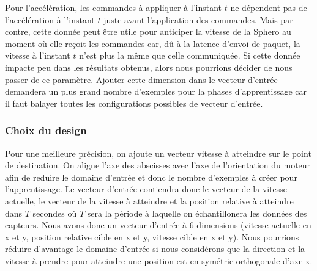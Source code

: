 Pour l'accélération, les commandes à appliquer à l'instant $t$ ne dépendent pas de l'accélération à l'instant $t$ juste avant l'application des commandes.
Mais par contre, cette donnée peut être utile pour anticiper la vitesse de la Sphero au moment où elle reçoit les commandes car, dû à la latence d'envoi de paquet, la vitesse à l'instant $t$ n'est plus la même que celle communiquée.
Si cette donnée impacte peu dans les résultats obtenus, alors nous pourrions décider de nous passer de ce paramètre.
Ajouter cette dimension dans le vecteur d'entrée demandera un plus grand nombre d'exemples pour la phases d'apprentissage car il faut balayer toutes les configurations possibles de vecteur d'entrée.

\newcommand{\inchist}[1]{
 \begin{minipage}{0.48\textwidth}
  \texttt{[image: ../figures/hist\#1.jpeg]}
 \end{minipage}
}
\subsubsection{Choix du design}\label{sec:choixdesign}
Pour une meilleure précision, on ajoute un vecteur vitesse à atteindre sur le point de destination.
On aligne l'axe des abscisses avec l'axe de l'orientation du moteur afin de reduire le domaine d'entrée et donc le nombre d'exemples à créer pour l'apprentissage.
Le vecteur d'entrée contiendra donc le vecteur de la vitesse actuelle, le vecteur de la vitesse à atteindre et la position relative à atteindre dans $T$ secondes où $T$ sera la période à laquelle on échantillonera les données des capteurs.
Nous avons donc un vecteur d'entrée à 6 dimensions (vitesse actuelle en x et y, position relative cible en x et y, vitesse cible en x et y).
Nous pourrions réduire d'avantage le domaine d'entrée si nous considérons que la direction et la vitesse à prendre pour atteindre une position est en symétrie orthogonale d'axe x.

